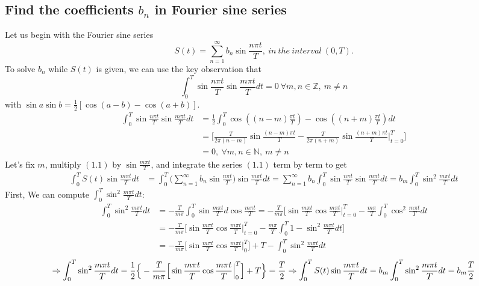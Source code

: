 \documentclass[a4 paper]{article}
\begin{document}
\subsection{Find the coefficients $b_n$ in Fourier sine series}
Let us begin with the Fourier sine series
\begin{equation}
    S(t)=\sum_{n=1}^\infty b_n\sin{\frac{n\pi t}{T}}, \ in \ the \ interval \ (0,T).
\end{equation}
To solve $b_n$ while $S(t)$ is given, we can use the key observation that $$\int_0^T \sin{\frac{n\pi t}{T}}\sin{\frac{m\pi t}{T}}dt=0 \ \forall m,n\in\mathbb{Z}, \  m\neq n$$ with $\sin{a}\sin{b}=\frac{1}{2}[\cos{(a-b)}-\cos{(a+b)}]$.
\begin{equation}
\begin{split}
\int_0^T \sin{\frac{n\pi t}{T}}\sin{\frac{m\pi t}{T}}dt&=\frac{1}{2}\int_0^T \cos{((n-m)\frac{\pi t}{T})}-\cos{((n+m)\frac{\pi t}{T})}dt\\&=\Big[\frac{T}{2\pi(n-m)}\sin{\frac{(n-m)\pi t}{T}}-\frac{T}{2\pi(n+m)}\sin{\frac{(n+m)\pi t}{T}}\Big|^T_{t=0}\Big]\\
&=0, \ \forall m,n\in\mathbb{N}, \ m\neq n
\end{split}
\end{equation} Let’s fix $m$, multiply $(1.1)$ by $\sin\frac{m\pi t}{T}$, and integrate the series $(1.1)$ term by term to get
\begin{equation}
\begin{split}
\int_0^T S(t)\sin{\frac{m\pi t}{T}}dt&=\int_0^T \Big(\sum_{n=1}^\infty b_n\sin{\frac{n\pi t}{T}}\Big)\sin{\frac{m\pi t}{T}}dt=\sum_{n=1}^\infty b_n\int_0^T \sin{\frac{n\pi t}{T}}\sin{\frac{m\pi t}{T}}dt=b_m\int_0^T \sin^2{\frac{m\pi t}{T}}dt
\end{split}
\end{equation} First, We can compute $\int_0^T\sin^2{\frac{m\pi t}{T}}dt$: \begin{equation}
\begin{split}
\int_0^T \sin^2{\frac{m\pi t}{T}}dt&=-\frac{T}{m\pi}\int_0^T\sin{\frac{m\pi t}{T}}d\cos{\frac{m\pi t}{T}}=-\frac{T}{m\pi}\Big[\sin{\frac{m\pi t}{T}}\cos{\frac{m\pi t}{T}}\Big|_{t=0}^T-\frac{m\pi}{T}\int_0^T \cos^2{\frac{m\pi t}{T}}dt\\&=-\frac{T}{m\pi}\Big[\sin{\frac{m\pi t}{T}}\cos{\frac{m\pi t}{T}}\Big|_{t=0}^T-\frac{m\pi}{T}\int_0^T 1-\sin^2{\frac{m\pi t}{T}}dt\Big]\\&=-\frac{T}{m\pi}\Big[\sin{\frac{m\pi t}{T}}\cos{\frac{m\pi t}{T}}\Big|_0^T\Big]+T-\int_0^T \sin^2{\frac{m\pi t}{T}}dt
\end{split}
\end{equation} $$\Rightarrow\int_0^T \sin^2{\frac{m\pi t}{T}}dt=\frac{1}{2}\Big\{-\frac{T}{m\pi}\Big[\sin{\frac{m\pi t}{T}}\cos{\frac{m\pi t}{T}}\Big|_0^T\Big]+T\Big\}=\frac{T}{2}\\\Rightarrow\int_0^T S(t)\sin{\frac{m\pi t}{T}}dt=b_m\int_0^T \sin^2{\frac{m\pi t}{T}}dt=b_m\frac{T}{2}$$
\end{document}
